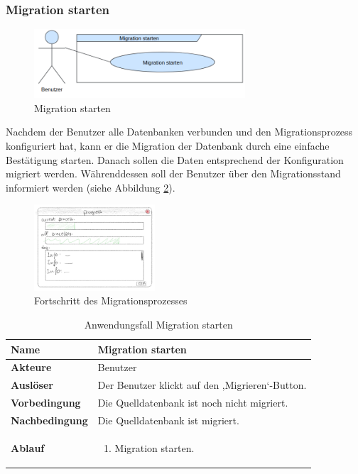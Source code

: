 \subsubsection*{Migration starten}
\begin{figure}[H]
	\centering
	\includegraphics[width=0.7\textwidth]{images/af/af-mg-starten}
	\caption{Migration starten}
	\label{img:af-mg-starten}
\end{figure}
Nachdem der Benutzer alle Datenbanken verbunden und den Migrationsprozess konfiguriert hat, kann er die Migration der Datenbank durch eine einfache Bestätigung starten. Danach sollen die Daten entsprechend der Konfiguration migriert werden. Währenddessen soll der Benutzer über den Migrationsstand informiert werden (siehe Abbildung \ref{img:progressview}).
\begin{figure}[H]
	\centering
	\includegraphics[width=0.4\textwidth]{images/progressview}
	\caption{Fortschritt des Migrationsprozesses}
	\label{img:progressview}
\end{figure}
\begin{table}[H]
	\centering
	\caption{Anwendungsfall Migration starten}
	\begin{tabular}{ |p{4cm}|p{8cm}| }
		\hline
		\textbf{Name} & Migration starten  \\
		\hline
		\textbf{Akteure} & Benutzer  \\
		\hline
		\textbf{Auslöser} & Der Benutzer klickt auf den ,Migrieren‘-Button. \\
		\hline
		\textbf{Vorbedingung} & Die Quelldatenbank ist noch nicht migriert.  \\
		\hline
		\textbf{Nachbedingung} & Die Quelldatenbank ist migriert.  \\
		\hline
		\textbf{Ablauf} &  
		\begin{enumerate}
			\item Migration starten.
		\end{enumerate}  \\
		\hline
		
	\end{tabular}
	\label{table:migration-starten}
\end{table}


